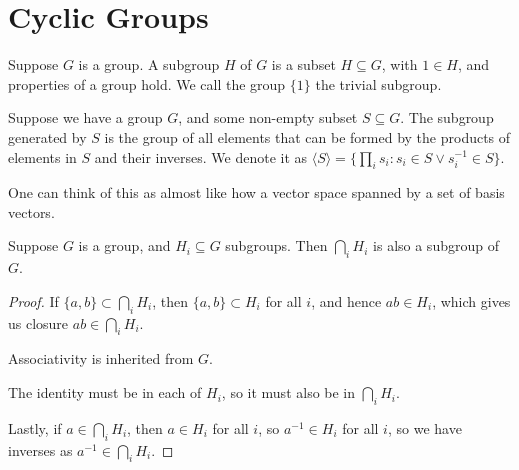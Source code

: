 \section{Cyclic Groups}

\begin{definition}
    Suppose \(G\) is a group.
    A subgroup \(H\) of \(G\) is a subset \(H \subseteq G\),
    with \(1 \in H\), and properties of a group hold.
    We call the group \(\{1\}\) the trivial subgroup.
\end{definition}

\begin{definition}
    Suppose we have a group \(G\),
    and some non-empty subset \(S \subseteq G\).
    The subgroup generated by \(S\)
    is the group of all elements that can be formed
    by the products of elements in \(S\) and their inverses.
    We denote it as
    \(\langle S \rangle = \{\prod_i s_i : s_i \in S \lor s_i^{-1} \in S\}\).
\end{definition}
\begin{remark}
    One can think of this as almost like how a vector space
    spanned by a set of basis vectors.
\end{remark}

\begin{lemma}\label{lem:intersection-subgroup}
    Suppose \(G\) is a group,
    and \(H_i \subseteq G\) subgroups.
    Then \(\bigcap_i H_i\) is also a subgroup of \(G\).
\end{lemma}
\begin{proof}
    If \(\{a,b\} \subset \bigcap_i H_i\),
    then \(\{a,b\} \subset H_i\) for all \(i\),
    and hence \(ab \in H_i\),
    which gives us closure \(ab \in \bigcap_i H_i\).

    Associativity is inherited from \(G\).

    The identity must be in each of \(H_i\),
    so it must also be in \(\bigcap_i H_i\).

    Lastly, if \(a \in \bigcap_i H_i\),
    then \(a \in H_i\) for all \(i\),
    so \(a^{-1} \in H_i\) for all \(i\),
    so we have inverses as \(a^{-1} \in \bigcap_i H_i\).
\end{proof}

